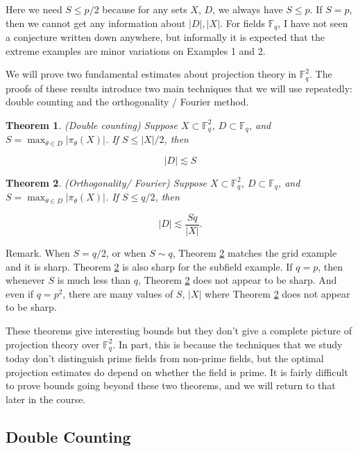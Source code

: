 \documentclass[12pt]{amsart}
\newtheorem{theorem}{Theorem}[section]
\newcommand{\FF}{\mathbb{F}}
\begin{document}
Here we need $S \le p/2$ because for any sets $X$, $D$, we always have $S \le p$.  If $S=p$, then we cannot get any information about $|D|, |X|$.  For fields $\FF_q$, I have not seen a conjecture written down anywhere, but informally it is expected that the extreme examples are minor variations on Examples 1 and 2.

We will prove two fundamental estimates about projection theory in $\FF_q^2$.  The proofs of these results introduce two main techniques that we will use repeatedly: double counting and the orthogonality / Fourier method.

\begin{theorem} \label{kaufmanfq} (Double counting) Suppose $X \subset \FF_q^2$, $D \subset \FF_q$, and $S = \max_{\theta \in D} |\pi_\theta(X)|$.  If $S \le |X|/2$, then

$$ |D| \lesssim S$$
    
\end{theorem}


\begin{theorem} \label{falconerfq}(Orthogonality/ Fourier) Suppose $X \subset \FF_q^2$, $D \subset \FF_q$, and $S = \max_{\theta \in D} |\pi_\theta(X)|$.  If $S \le q/2$, then

$$ |D| \lesssim \frac{S q}{|X|}. $$
    
\end{theorem}

Remark. When $S =q/2$, or when $S \sim q$, Theorem \ref{falconerfq} matches the grid example and it is sharp.  Theorem \ref{falconerfq} is also sharp for the subfield example.  If $q=p$, then whenever $S$ is much less than $q$, Theorem \ref{falconerfq} does not appear to be sharp.  And even if $q=p^2$, there are many values of $S$, $|X|$ where Theorem \ref{falconerfq} does not appear to be sharp.

These theorems give interesting bounds but they don't give a complete picture of projection theory over $\FF_q^2$.  In part, this is because the techniques that we study today don't distinguish prime fields from non-prime fields, but the optimal projection estimates do depend on whether the field is prime.  It is fairly difficult to prove bounds going beyond these two theorems, and we will return to that later in the course.

\subsection{Double Counting}
\end{document}
